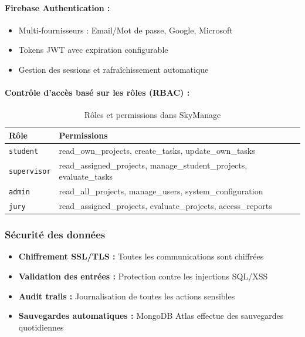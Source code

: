 \paragraph{Firebase Authentication :}
\begin{itemize}
    \item Multi-fournisseurs : Email/Mot de passe, Google, Microsoft
    \item Tokens JWT avec expiration configurable
    \item Gestion des sessions et rafraîchissement automatique
\end{itemize}

\paragraph{Contrôle d'accès basé sur les rôles (RBAC) :}
\begin{table}[h!]
\centering
\caption{Rôles et permissions dans SkyManage}
\label{tab:rbac}
\begin{tabular}{|l|p{5cm}|}
\hline
\textbf{Rôle} & \textbf{Permissions} \\
\hline
\texttt{student} & read\_own\_projects, create\_tasks, update\_own\_tasks \\
\hline
\texttt{supervisor} & read\_assigned\_projects, manage\_student\_projects, evaluate\_tasks \\
\hline
\texttt{admin} & read\_all\_projects, manage\_users, system\_configuration \\
\hline
\texttt{jury} & read\_assigned\_projects, evaluate\_projects, access\_reports \\
\hline
\end{tabular}
\end{table}

\subsubsection{Sécurité des données}
\begin{itemize}
    \item \textbf{Chiffrement SSL/TLS :} Toutes les communications sont chiffrées
    \item \textbf{Validation des entrées :} Protection contre les injections SQL/XSS
    \item \textbf{Audit trails :} Journalisation de toutes les actions sensibles
    \item \textbf{Sauvegardes automatiques :} MongoDB Atlas effectue des sauvegardes quotidiennes
\end{itemize}

